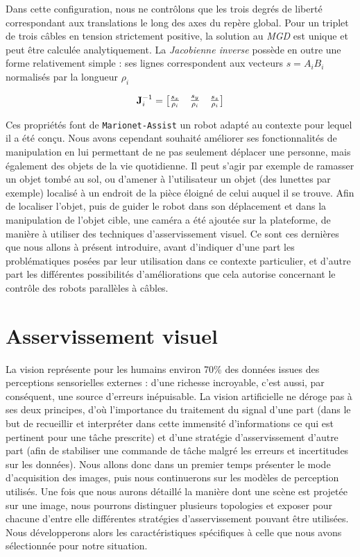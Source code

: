 Dans cette configuration, nous ne contrôlons que les trois degrés de liberté correspondant aux translations le long des axes du repère global. Pour un triplet de trois câbles en tension strictement positive, la solution au {\it MGD} est unique et peut être calculée analytiquement. La {\it Jacobienne inverse} possède en outre une forme relativement simple : ses lignes correspondent aux vecteurs $s = A_iB_i$ normalisés par la longueur $\rho_i$

\begin{equation}
{\bf J}^{-1}_i =
\begin{bmatrix}
 \frac {s_x} {\rho_i} & \frac {s_y} {\rho_i} & \frac {s_z} {\rho_i}
\end{bmatrix}
\label{intro:eq11}
\end{equation}

Ces propriétés font de {\tt Marionet-Assist} un robot adapté au contexte pour lequel il a été conçu. Nous avons cependant souhaité améliorer ses fonctionnalités de manipulation en lui permettant de ne pas seulement déplacer une personne, mais également des objets de la vie quotidienne. Il peut s'agir par exemple de ramasser un objet tombé au sol, ou d'amener à l'utilisateur un objet (des lunettes par exemple) localisé à un endroit de la pièce éloigné de celui auquel il se trouve. Afin de localiser l'objet, puis de guider le robot dans son déplacement et dans la manipulation de l'objet cible, une caméra a été ajoutée sur la plateforme, de manière à utiliser des techniques d'asservissement visuel. Ce sont ces dernières que nous allons à présent introduire, avant d'indiquer d'une part les problématiques posées par leur utilisation dans ce contexte particulier, et d'autre part les différentes possibilités d'améliorations que cela autorise concernant le contrôle des robots parallèles à câbles.

\section{Asservissement visuel}

 La vision représente pour les humains environ 70\% des données issues des perceptions sensorielles externes \cite{no} : d'une richesse incroyable, c'est aussi, par conséquent, une source d'erreurs inépuisable. La vision artificielle ne déroge pas à ses deux principes, d'où l'importance du traitement du signal d'une part (dans le but de recueillir et interpréter dans cette immensité d'informations ce qui est pertinent pour une tâche prescrite) et d'une stratégie d'asservissement d'autre part (afin de stabiliser une commande de tâche malgré les erreurs et incertitudes sur les données). Nous allons donc dans un premier temps présenter le mode d'acquisition des images, puis nous continuerons sur les modèles de perception utilisés. Une fois que nous aurons détaillé la manière dont une scène est projetée sur une image, nous pourrons distinguer plusieurs topologies et exposer pour chacune d'entre elle différentes stratégies d'asservissement pouvant être utilisées. Nous développerons alors les caractéristiques spécifiques à celle que nous avons sélectionnée pour notre situation.
 

